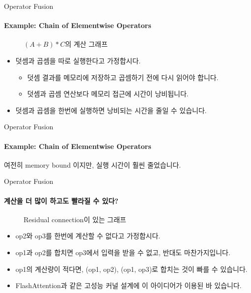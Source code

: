 \begin{frame}{Operator Fusion}
\framesubtitle{Example: Chain of Elementwise Operators}

\begin{figure}
  \centering
  \caption{\((A + B) * C\)의 계산 그래프}
\end{figure}

\begin{itemize}
  \item 덧셈과 곱셈을 따로 실행한다고 가정합시다.
  \begin{itemize}
    \item 덧셈 결과를 메모리에 저장하고 곱셈하기 전에 다시 읽어야 합니다.
    \item 덧셈과 곱셈 연산보다 메모리 접근에 시간이 낭비됩니다.
  \end{itemize}
  \item 덧셈과 곱셈을 한번에 실행하면 낭비되는 시간을 줄일 수 있습니다.
\end{itemize}
\end{frame}

\begin{frame}{Operator Fusion}
\framesubtitle{Example: Chain of Elementwise Operators}

\begin{figure}
  \centering
  \resizebox{\linewidth}{!}{}
\end{figure}

여전히 memory bound 이지만, 실행 시간이 훨씬 줄었습니다.
\end{frame}

\begin{frame}{Operator Fusion}
\framesubtitle{계산을 더 많이 하고도 빨라질 수 있다?}

\begin{figure}
  \centering
  \caption{Residual connection이 있는 그래프}
\end{figure}

\begin{itemize}
  \item op2와 op3를 한번에 계산할 수 없다고 가정합시다.
  \item op1과 op2를 합치면 op3에서 입력을 받을 수 없고, 반대도 마찬가지입니다.
  \pause
  \item op1의 계산량이 적다면, (op1, op2), (op1, op3)로 합치는 것이 빠를 수 있습니다.
  \item FlashAttention과 같은 고성능 커널 설계에 이 아이디어가 이용된 바 있습니다.
\end{itemize}
\end{frame}